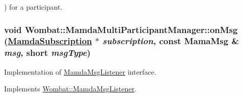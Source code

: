) for a participant. \hypertarget{classWombat_1_1MamdaMultiParticipantManager_7c7586474bb08e9d9d05198459fdf245}{
\subsubsection[onMsg]{\setlength{\rightskip}{0pt plus 5cm}void Wombat::Mamda\-Multi\-Participant\-Manager::on\-Msg (\hyperlink{classWombat_1_1MamdaSubscription}{Mamda\-Subscription} $\ast$ {\em subscription}, const Mama\-Msg \& {\em msg}, short {\em msg\-Type})}}
\label{classWombat_1_1MamdaMultiParticipantManager_7c7586474bb08e9d9d05198459fdf245}


Implementation of \hyperlink{classWombat_1_1MamdaMsgListener}{Mamda\-Msg\-Listener} interface. 



Implements \hyperlink{classWombat_1_1MamdaMsgListener_c700829ebcce095b95b8b67b39a1c67d}{Wombat::Mamda\-Msg\-Listener}.